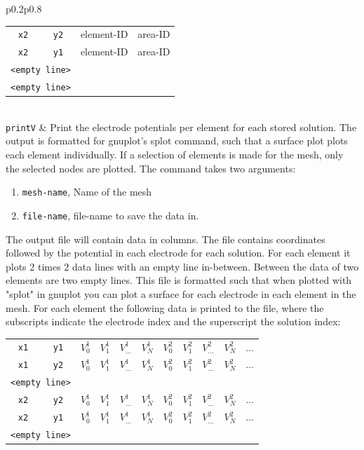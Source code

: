 \documentclass[noshowpacs,preprintnumbers,amsmath,amssymb, letter]{revtex4}
\begin{document}
\begin{longtable}{p{}p{}}
\begin{tabular}{cccc}
	\texttt{x2} & \texttt{y2} & element-ID & area-ID \\
	\texttt{x2} & \texttt{y1} & element-ID & area-ID \\
	\multicolumn{2}{l}{\texttt{<empty line>}}\\
	\multicolumn{2}{l}{\texttt{<empty line>}}\\
\end{tabular}\\
\texttt{printV}		& Print the electrode potentials per element for each stored solution. The output is formatted for gnuplot's splot command, such that a surface plot plots each element individually. If a selection of elements is made for the mesh, only the selected nodes are plotted. The command takes two arguments:
\begin{enumerate}
\item \texttt{mesh-name}, Name of the mesh
\item \texttt{file-name}, file-name to save the data in.
\end{enumerate}
The output file will contain data in columns. The file contains coordinates followed by the potential in each electrode for each solution. For each element it plots 2 times 2 data lines with an empty line in-between. Between the data of two elements are two empty lines. This file is formatted such that when plotted with "splot" in gnuplot you can plot a surface for each electrode in each element in the mesh. For each element the following data is printed to the file, where the subscripts indicate the electrode index and the superscript the solution index:\newline 
\begin{tabular}{ccccccccccc}
	\texttt{x1} & \texttt{y1} & $V_0^1$ & $V_1^1$ & $V_{...}^1$ & $V_N^1$ & $V_0^2$ & $V_1^2$ & $V_{...}^2$ & $V_N^2$& ...\\
	\texttt{x1} & \texttt{y2} & $V_0^1$ & $V_1^1$ & $V_{...}^1$ & $V_N^1$ & $V_0^2$ & $V_1^2$ & $V_{...}^2$ & $V_N^2$& ...\\
	\multicolumn{2}{l}{\texttt{<empty line>}}\\
	\texttt{x2} & \texttt{y2} & $V_0^1$ & $V_1^1$ & $V_{...}^1$ & $V_N^1$ & $V_0^2$ & $V_1^2$ & $V_{...}^2$ & $V_N^2$& ...\\
	\texttt{x2} & \texttt{y1} & $V_0^1$ & $V_1^1$ & $V_{...}^1$ & $V_N^1$ & $V_0^2$ & $V_1^2$ & $V_{...}^2$ & $V_N^2$& ...\\
	\multicolumn{2}{l}{\texttt{<empty line>}}\\

\end{tabular}
\end{longtable}
\end{document}
